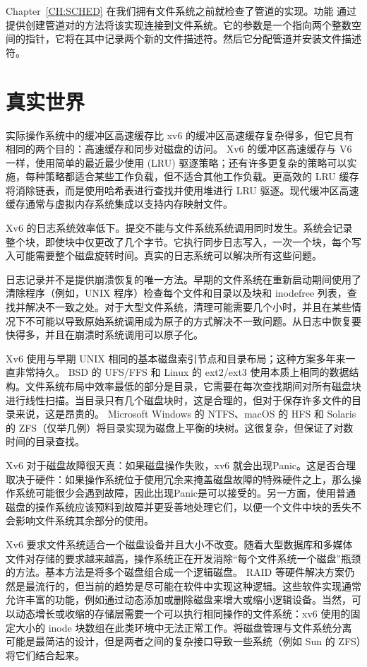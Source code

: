 Chapter~\ref{CH:SCHED}    在我们拥有文件系统之前就检查了管道的实现。功能
        通过提供创建管道对的方法将该实现连接到文件系统。它的参数是一个指向两个整数空间的指针，它将在其中记录两个新的文件描述符。然后它分配管道并安装文件描述符。
    \section{真实世界  }     

实际操作系统中的缓冲区高速缓存比 xv6 的缓冲区高速缓存复杂得多，但它具有相同的两个目的：高速缓存和同步对磁盘的访问。 Xv6 的缓冲区高速缓存与 V6 一样，使用简单的最近最少使用 (LRU) 驱逐策略；还有许多更复杂的策略可以实施，每种策略都适合某些工作负载，但不适合其他工作负载。更高效的 LRU 缓存将消除链表，而是使用哈希表进行查找并使用堆进行 LRU 驱逐。现代缓冲区高速缓存通常与虚拟内存系统集成以支持内存映射文件。  

Xv6 的日志系统效率低下。提交不能与文件系统系统调用同时发生。系统会记录整个块，即使块中仅更改了几个字节。它执行同步日志写入，一次一个块，每个写入可能需要整个磁盘旋转时间。真实的日志系统可以解决所有这些问题。  

日志记录并不是提供崩溃恢复的唯一方法。早期的文件系统在重新启动期间使用了清除程序（例如，UNIX
        程序）检查每个文件和目录以及块和 inodefree 列表，查找并解决不一致之处。对于大型文件系统，清理可能需要几个小时，并且在某些情况下不可能以导致原始系统调用成为原子的方式解决不一致问题。从日志中恢复要快得多，并且在崩溃时系统调用可以原子化。  

Xv6 使用与早期 UNIX 相同的基本磁盘索引节点和目录布局；这种方案多年来一直非常持久。 BSD 的 UFS/FFS 和 Linux 的 ext2/ext3 使用本质上相同的数据结构。文件系统布局中效率最低的部分是目录，它需要在每次查找期间对所有磁盘块进行线性扫描。当目录只有几个磁盘块时，这是合理的，但对于保存许多文件的目录来说，这是昂贵的。 Microsoft Windows 的 NTFS、macOS 的 HFS 和 Solaris 的 ZFS（仅举几例）将目录实现为磁盘上平衡的块树。这很复杂，但保证了对数时间的目录查找。  

Xv6 对于磁盘故障很天真：如果磁盘操作失败，xv6 就会出现Panic。这是否合理取决于硬件：如果操作系统位于使用冗余来掩盖磁盘故障的特殊硬件之上，那么操作系统可能很少会遇到故障，因此出现Panic是可以接受的。另一方面，使用普通磁盘的操作系统应该预料到故障并更妥善地处理它们，以便一个文件中块的丢失不会影响文件系统其余部分的使用。  

Xv6 要求文件系统适合一个磁盘设备并且大小不改变。随着大型数据库和多媒体文件对存储的要求越来越高，操作系统正在开发消除“每个文件系统一个磁盘”瓶颈的方法。基本方法是将多个磁盘组合成一个逻辑磁盘。 RAID 等硬件解决方案仍然是最流行的，但当前的趋势是尽可能在软件中实现这种逻辑。这些软件实现通常允许丰富的功能，例如通过动态添加或删除磁盘来增大或缩小逻辑设备。当然，可以动态增长或收缩的存储层需要一个可以执行相同操作的文件系统：xv6 使用的固定大小的 inode 块数组在此类环境中无法正常工作。将磁盘管理与文件系统分离可能是最简洁的设计，但是两者之间的复杂接口导致一些系统（例如 Sun 的 ZFS）将它们结合起来。  

